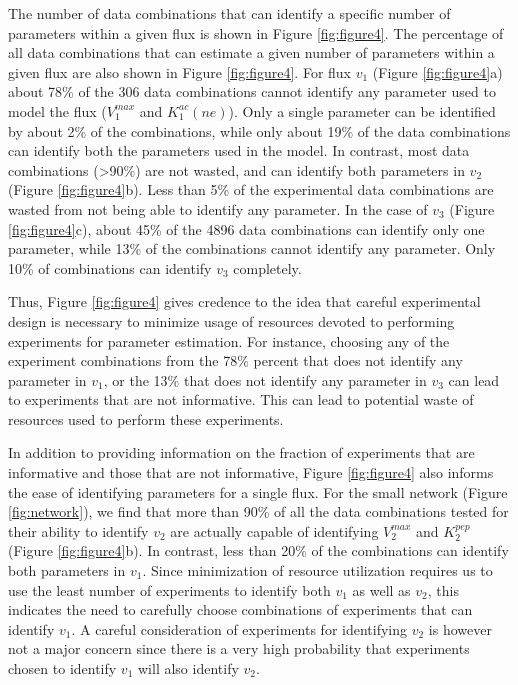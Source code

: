 \documentclass[10pt]{article}
\begin{document}
	The number of data combinations that can identify a specific number of parameters within a given flux is shown in Figure \ref{fig:figure4}. The percentage of all data combinations that can estimate a given number of parameters within a given flux are also shown in Figure \ref{fig:figure4}. For flux $v_1$ (Figure \ref{fig:figure4}a) about 78\% of the 306 data combinations cannot identify any parameter used to model the flux ($V_1^{max}$ and $K_1^{ac}(ne)$). Only a single parameter can be identified by about 2\% of the combinations, while only about 19\% of the data combinations can identify both the parameters used in the model. 	
	In contrast, most data combinations (>90\%) are not wasted, and can identify both parameters in $v_2$ (Figure \ref{fig:figure4}b). Less than 5\% of the experimental data combinations are wasted from not being able to identify any parameter. In the case of $v_3$ (Figure \ref{fig:figure4}c), about 45\% of the 4896 data combinations can identify only one parameter, while 13\% of the combinations cannot identify any parameter. Only 10\% of combinations can identify $v_3$ completely. 
	
	Thus, Figure \ref{fig:figure4} gives credence to the idea that careful experimental design is necessary to minimize usage of resources devoted to performing experiments for parameter estimation. For instance, choosing any of the experiment combinations from the 78\% percent that does not identify any parameter in $v_1$, or the 13\% that does not identify any parameter in $v_3$ can lead to experiments that are not informative. This can lead to potential waste of resources used to perform these experiments.	 
	
	In addition to providing information on the fraction of experiments that are informative and those that are not informative, Figure \ref{fig:figure4} also informs the ease of identifying parameters for a single flux. For the small network (Figure \ref{fig:network}), we find that more than 90\% of all the data combinations tested for their ability to identify $v_2$ are actually capable of identifying $V_2^{max}$ and $K_2^{pep}$ (Figure \ref{fig:figure4}b). In contrast, less than 20\% of the combinations can identify both parameters in $v_1$. Since minimization of resource utilization requires us to use the least number of experiments to identify both $v_1$ as well as $v_2$, this indicates the need to carefully choose combinations of experiments that can identify $v_1$. A careful consideration of experiments for identifying $v_2$ is however not a major concern since there is a very high probability that experiments chosen to identify $v_1$ will also identify $v_2$. 	
	
\end{document}
